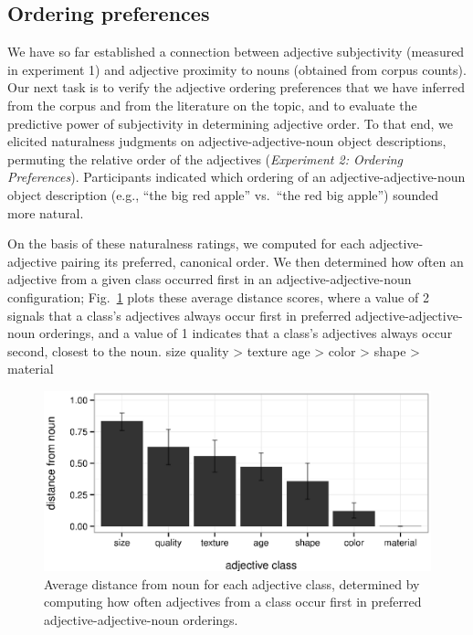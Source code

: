 \documentclass{pnastwo}
\begin{document}
\begin{article}
\subsection{Ordering preferences}
We have so far established a connection between adjective subjectivity (measured in experiment 1) and adjective proximity to nouns (obtained from corpus counts). Our next task is to verify the adjective ordering preferences that we have inferred from the corpus and from the literature on the topic, and to evaluate the predictive power of subjectivity in determining adjective order. To that end, we elicited naturalness judgments on adjective-adjective-noun object descriptions, permuting the relative order of the adjectives (\emph{Experiment 2: Ordering Preferences}). Participants indicated which ordering of an adjective-adjective-noun object description (e.g., ``the big red apple'' vs.\ ``the red big apple'') sounded more natural. 

On the basis of these naturalness ratings, we computed for each adjective-adjective pairing its preferred, canonical order. We then determined how often an adjective from a given class occurred first in an adjective-adjective-noun configuration; Fig.\ \ref{class-distance-by-adj} plots these average distance scores, where a value of 2 signals that a class's adjectives always occur first in preferred adjective-adjective-noun orderings, and a value of 1 indicates that a class's adjectives always occur second, closest to the noun.
\be size \geq quality > texture \geq age > color > shape > material \label{inferred-preference}\ee

\begin{figure}[h]
	\centering
	\includegraphics[width=.95\linewidth]{plots/class_distance_by_adj.eps}
	\caption{Average distance from noun for each adjective class, determined by computing how often adjectives from a class occur first in preferred adjective-adjective-noun orderings.}\label{class-distance-by-adj}
\end{figure}


\end{article}
\end{document}
